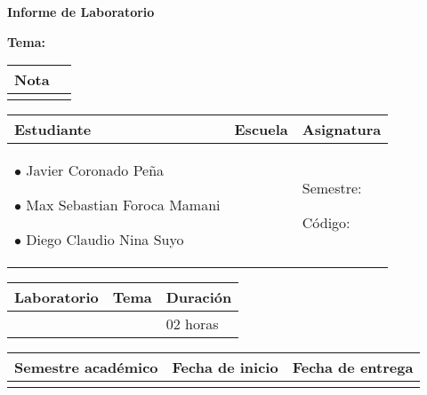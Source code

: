 \vspace*{10px}

\begin{center}	
	\fontsize{17}{17} \textbf{ Informe de Laboratorio \itemPracticeNumber}
\end{center}
\centerline{\textbf{\Large Tema: \itemTheme}}

\begin{flushright}
	\begin{tabular}{|M{2.5cm}|N|}
		\hline 
		\color{white} \textbf{Nota}  \\
		\hline 
		\\[30pt]
		\hline 			
	\end{tabular}
\end{flushright}	

\begin{table}[H]
	\begin{tabular}{|x{4.7cm}|x{4.8cm}|x{4.8cm}|}
		\hline 
		\color{white} \textbf{Estudiante} & \color{white}\textbf{Escuela}  & \color{white}\textbf{Asignatura}   \\
		\hline 
		{$\bullet$ Javier Coronado Peña \par$\bullet$ Max Sebastian Foroca Mamani \par$\bullet$ Diego Claudio Nina Suyo} & \itemSchool & {\itemCourse \par Semestre: \itemSemester \par Código: \itemCourseCode}     \\
		\hline 			
	\end{tabular}
\end{table}		

\begin{table}[H]
	\begin{tabular}{|x{4.7cm}|x{4.8cm}|x{4.8cm}|}
		\hline 
		\color{white}\textbf{Laboratorio} & \color{white}\textbf{Tema}  & \color{white}\textbf{Duración}   \\
		\hline 
		\itemPracticeNumber & \itemTheme & 02 horas   \\
		\hline 
	\end{tabular}
\end{table}

\begin{table}[H]
	\begin{tabular}{|x{4.7cm}|x{4.8cm}|x{4.8cm}|}
		\hline 
		\color{white}\textbf{Semestre académico} & \color{white}\textbf{Fecha de inicio}  & \color{white}\textbf{Fecha de entrega}   \\
		\hline 
		\itemAcademic & \itemInput &  \itemOutput  \\
		\hline 
	\end{tabular}
\end{table}